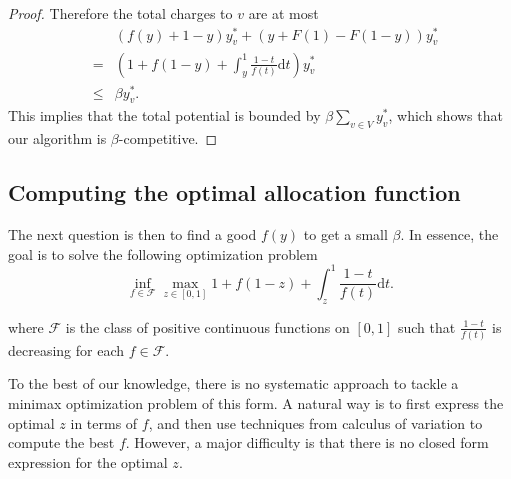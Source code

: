 \documentclass{article}
\begin{document}
\begin{proof}
Therefore the total charges to $v$ are at most
\begin{eqnarray*}
&&\left(f(y)+1-y\right)y_v^*+\left(y+F(1)-F(1-y)\right)y_v^*\\
&=& \left(1+f(1-y)+\int_y^1 \frac{1-t}{f(t)}\mathrm{d}t\right)y_v^*\\
&\leq& \beta y_v^*.
\end{eqnarray*}
This implies that the total potential is bounded by $\beta\sum_{v\in V} y_v^*$, which shows that our algorithm is $\beta$-competitive.
\end{proof}


\subsection{Computing the optimal allocation function}
\label{sec:optimization}

The next question is then to find a good $f(y)$ to get a small $\beta$. In essence, the goal is to solve the following optimization problem 
\begin{equation}
\label{eqn:opt}
\inf_{f\in \mathcal{F}}\max_{z\in [0,1]} 1+f(1-z)+\int_z^1 \frac{1-t}{f(t)}\mathrm{d}t.
\end{equation}


where $\mathcal{F}$ is the class of positive continuous functions on $[0,1]$ such that $\frac{1-t}{f(t)}$ is decreasing for each $f\in \mathcal{F}$.


To the best of our knowledge, there is no systematic approach to tackle a minimax optimization problem of this form. A natural way is to first express the optimal $z$ in terms of $f$, and then use techniques from calculus of variation to compute the best $f$. However, a major difficulty is that there is no closed form expression for the optimal $z$. 
\end{document}
